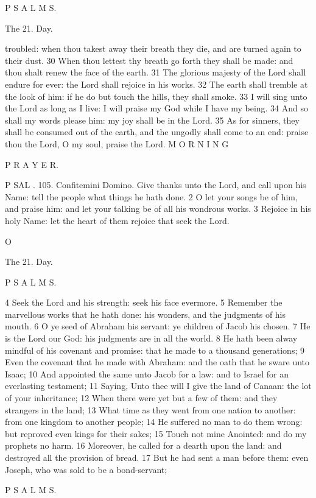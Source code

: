 P S A L M S.

The 21. Day.

troubled: when thou takest away their breath they die, and are turned again to their dust. 30 When thou lettest thy breath go forth they shall be made: and thou shalt renew the face of the earth. 31 The glorious majesty of the Lord shall endure for ever: the Lord shall rejoice in his works. 32 The earth shall tremble at the look of him: if he do but touch the hills, they shall smoke. 33 I will sing unto the Lord as long as I live: I will praise my God while I have my being. 34 And so shall my words please him: my joy shall be in the Lord. 35 As for sinners, they shall be consumed out of the earth, and the ungodly shall come to an end: praise thou the Lord, O my soul, praise the Lord. M O R N I N G

P R A Y E R.

P SAL . 105. Confitemini Domino. Give thanks unto the Lord, and call upon his Name: tell the people what things he hath done. 2 O let your songs be of him, and praise him: and let your talking be of all his wondrous works. 3 Rejoice in his holy Name: let the heart of them rejoice that seek the Lord.

O

The 21. Day.

P S A L M S.

4 Seek the Lord and his strength: seek his face evermore. 5 Remember the marvellous works that he hath done: his wonders, and the judgments of his mouth. 6 O ye seed of Abraham his servant: ye children of Jacob his chosen. 7 He is the Lord our God: his judgments are in all the world. 8 He hath been alway mindful of his covenant and promise: that he made to a thousand generations; 9 Even the covenant that he made with Abraham: and the oath that he sware unto Isaac; 10 And appointed the same unto Jacob for a law: and to Israel for an everlasting testament; 11 Saying, Unto thee will I give the land of Canaan: the lot of your inheritance; 12 When there were yet but a few of them: and they strangers in the land; 13 What time as they went from one nation to another: from one kingdom to another people; 14 He suffered no man to do them wrong: but reproved even kings for their sakes; 15 Touch not mine Anointed: and do my prophets no harm. 16 Moreover, he called for a dearth upon the land: and destroyed all the provision of bread. 17 But he had sent a man before them: even Joseph, who was sold to be a bond-servant;

P S A L M S.

